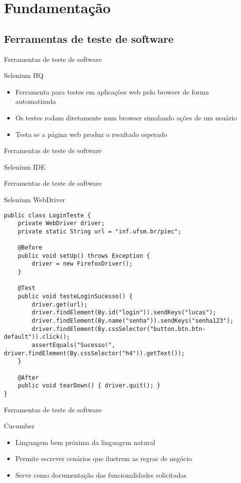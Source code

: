 \documentclass{beamer}
\begin{document}
\section{Fundamentação}
\subsection{Ferramentas de teste de software}
\begin{frame}{Ferramentas de teste de software}
    \item Selenium HQ
	\begin{itemize}
		\item Ferramenta para testes em aplicações web pelo browser de forma automatizada
        \item Os testes rodam diretamente num browser simulando ações de um usuário
        \item Testa se a página web produz o resultado esperado
	\end{itemize}
\end{frame}
\begin{frame}{Ferramentas de teste de software}
    \item Selenium IDE
    \begin{center}\end{center}
\end{frame}
\begin{frame}[fragile]{Ferramentas de teste de software}
    \item Selenium WebDriver
    \begin{lstlisting}
public class LoginTeste {
    private WebDriver driver;
    private static String url = "inf.ufsm.br/piec";

    @Before
    public void setUp() throws Exception {
        driver = new FirefoxDriver();
    }

    @Test
    public void testeLoginSucesso() {
        driver.get(url);
        driver.findElement(By.id("login")).sendKeys("lucas");
        driver.findElement(By.name("senha")).sendKeys("senha123");
        driver.findElement(By.cssSelector("button.btn.btn-default")).click();
        assertEquals("Sucesso!", driver.findElement(By.cssSelector("h4")).getText());
    }

    @After
    public void tearDown() { driver.quit(); }
}
	\end{lstlisting}
\end{frame}
\begin{frame}[fragile]{Ferramentas de teste de software}
    \item Cucumber
	\begin{itemize}
		\item Linguagem bem próxima da linguagem natural
		\item Permite escrever cenários que ilustrem as regras de negócio
        \item Serve como documentação das funcionalidades solicitadas
	\end{itemize}
\end{frame}
\end{document}
